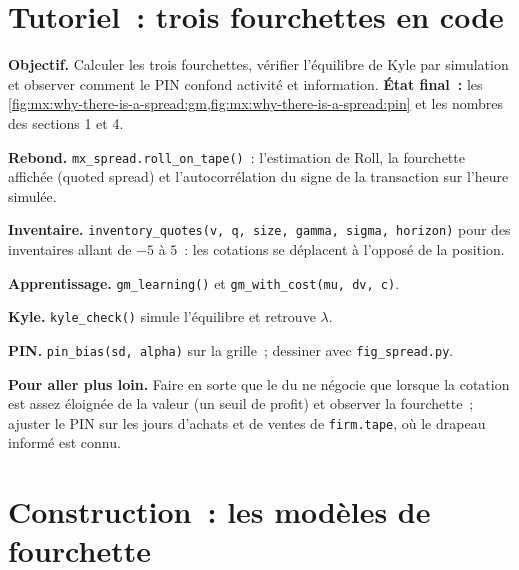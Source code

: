 \section{Tutoriel~: trois fourchettes en code}\label{tut:mx:why-there-is-a-spread:tut}

\begin{tutorial}
\textbf{Objectif.} Calculer les trois fourchettes, vérifier l'équilibre de Kyle par simulation et observer comment le PIN confond activité et information.
\textbf{État final~:} les \cref{fig:mx:why-there-is-a-spread:gm,fig:mx:why-there-is-a-spread:pin} et les nombres des sections 1 et 4.
\begin{tutsteps}
\item \textbf{Rebond.} \texttt{mx\_spread.roll\_on\_tape()}~: l'estimation de Roll, la fourchette affichée (quoted spread) et l'autocorrélation du signe de la transaction sur l'heure simulée.
\item \textbf{Inventaire.} \texttt{inventory\_quotes(v, q, size, gamma, sigma, horizon)} pour des inventaires allant de $-5$ à $5$~: les cotations se déplacent à l'opposé de la
position.
\item \textbf{Apprentissage.} \texttt{gm\_learning()} et \texttt{gm\_with\_cost(mu, dv, c)}.
\item \textbf{Kyle.} \texttt{kyle\_check()} simule l'équilibre et retrouve $\lambda$.
\item \textbf{PIN.} \texttt{pin\_bias(sd, alpha)} sur la grille~; dessiner avec \texttt{fig\_spread.py}.
\end{tutsteps}
\textbf{Pour aller plus loin.} Faire en sorte que le  du  ne négocie que lorsque la cotation est assez éloignée de la valeur
(un seuil de profit) et observer la fourchette~; ajuster le PIN sur les jours d'achats et de ventes de \texttt{firm.tape}, où le drapeau informé est connu.
\end{tutorial}

\section{Construction~: les modèles de fourchette}\label{bld:mx:why-there-is-a-spread:spreadmodels}

